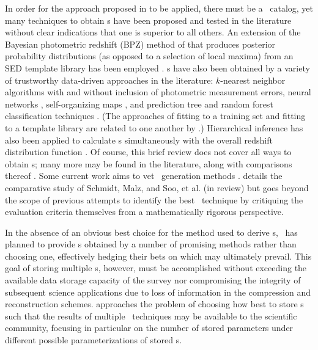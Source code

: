 
In order for the approach proposed in  to be applied, there must be a \pzpdf\ catalog, yet many techniques to obtain \pzpdf s have been proposed and tested in the literature without clear indications that one is superior to all others.  
An extension of the Bayesian photometric redshift (BPZ) method of \citet{Benitez2000} that produces posterior probability distributions (as opposed to a selection of local maxima) from an SED template library has been employed \citep{Hildebrandt2012, Kelly2014, Lopez-Sanjuan2015}.  
\Pzpdf s have also been obtained by a variety of trustworthy data-driven approaches in the literature: $k$-nearest neighbor algorithms with \citep{Ball2008} and without \citep{Sheldon2012} inclusion of photometric measurement errors, neural networks \citep{Bonnett2015a}, self-organizing maps \citep{CarrascoKind2014a}, and prediction tree and random forest classification techniques \citep{Carliles2010, CarrascoKind2013}.  
(The approaches of fitting to a training set and fitting to a template library are related to one another by \citet{Budavari2009}.)  
Hierarchical inference has also been applied to calculate \pzpdf s simultaneously with the overall redshift distribution function \citep{Leistedt2016}.  
Of course, this brief review does not cover all ways to obtain \pzpdf s; many more may be found in the literature, along with comparisons thereof \citep{Hildebrandt2010, Dahlen2013, Sanchez2013, Bonnett2015}.
Some current work aims to vet \pzpdf\ generation methods \citep{Wittman2016}.
 details the comparative study of Schmidt, Malz, and Soo, et al. (in review) but goes beyond the scope of previous attempts to identify the best \pzpdf\ technique by critiquing the evaluation criteria themselves from a mathematically rigorous perspective.

In the absence of an obvious best choice for the method used to derive \pzpdf s, \lsst\ has planned to provide \pzpdf s obtained by a number of promising methods rather than choosing one, effectively hedging their bets on which may ultimately prevail.
This goal of storing multiple \pzpdf s, however, must be accomplished without exceeding the available data storage capacity of the survey nor compromising the integrity of subsequent science applications due to loss of information in the compression and reconstruction schemes.
 approaches the problem of choosing how best to store \pzpdf s such that the results of multiple \pzpdf\ techniques may be available to the scientific community, focusing in particular on the number of stored parameters under different possible parameterizations of stored \pzpdf s.


